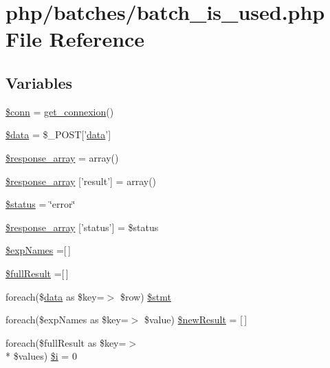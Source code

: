 \hypertarget{batch__is__used_8php}{\section{php/batches/batch\-\_\-is\-\_\-used.php File Reference}
\label{batch__is__used_8php}
}
\subsection*{Variables}
\begin{DoxyCompactItemize}
\item 
\hyperlink{batch__is__used_8php_aa8a5a87b9c1a6a0819b88447cbe41877}{\$conn} = \hyperlink{php__functions_8php_ace18bc10f3fd08f92688ac743e0d8c2e}{get\-\_\-connexion}()
\item 
\hyperlink{batch__is__used_8php_a6efc15b5a2314dd4b5aaa556a375c6d6}{\$data} = \$\-\_\-\-P\-O\-S\-T\mbox{[}'\hyperlink{chart1_8php_ab3ed669f4b3fdb8c88f3a190fb907de0}{data}'\mbox{]}
\item 
\hyperlink{batch__is__used_8php_a6c0fd6f414374ab1b1e16b2a4b625004}{\$response\-\_\-array} = array()
\item 
\hyperlink{batch__is__used_8php_ada5564dc28774e85d6fea1465312dba4}{\$response\-\_\-array} \mbox{[}'result'\mbox{]} = array()
\item 
\hyperlink{batch__is__used_8php_a58391ea75f2d29d5d708d7050b641c33}{\$status} = \char`\"{}error\char`\"{}
\item 
\hyperlink{batch__is__used_8php_a370f3b80b4eb90ab0a25d451497f627e}{\$response\-\_\-array} \mbox{[}'status'\mbox{]} = \$status
\item 
\hyperlink{batch__is__used_8php_a8d5bac2f2b410351f073c23d51d262cf}{\$exp\-Names} =\mbox{[}$\,$\mbox{]}
\item 
\hyperlink{batch__is__used_8php_a7ce9324a2e06fc9170b9dafc76465fb7}{\$full\-Result} =\mbox{[}$\,$\mbox{]}
\item 
foreach(\$\hyperlink{chart1_8php_ab3ed669f4b3fdb8c88f3a190fb907de0}{data} as \$key=$>$ \$row) \hyperlink{batch__is__used_8php_af5d11c3388f67ea3b6be7fe839293799}{\$stmt}
\item 
foreach(\$exp\-Names as \$key=$>$ \$value) \hyperlink{batch__is__used_8php_af9b19996aa7a415218a214650987ebc9}{\$new\-Result} = \mbox{[}$\,$\mbox{]}
\item 
foreach(\$full\-Result as \$key=$>$\\*
 \$values) \hyperlink{batch__is__used_8php_ac2cff670cd6bb522803dae2768c136c7}{\$i} = 0
\end{DoxyCompactItemize}


